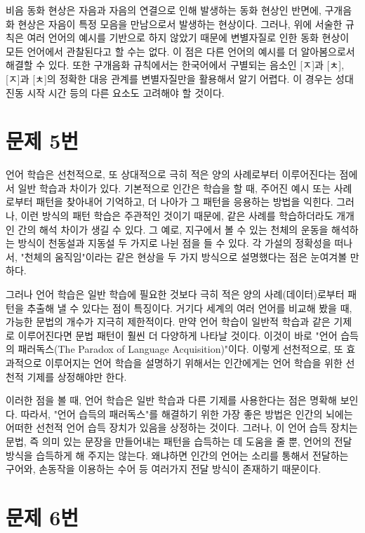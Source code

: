 \documentclass{article}
\begin{document}
            비음 동화 현상은 자음과 자음의 연결으로 인해 발생하는 동화 현상인 반면에, 구개음화 현상은 자음이 특정 모음을 만남으로서 발생하는 현상이다. 그러나, 위에 서술한 규칙은 여러 언어의 예시를 기반으로 하지 않았기 때문에 변별자질로 인한 동화 현상이 모든 언어에서 관찰된다고 할 수는 없다. 이 점은 다른 언어의 예시를 더 알아봄으로서 해결할 수 있다. 또한 구개음화 규칙에서는 한국어에서 구별되는 음소인 [ㅈ]과 [ㅊ], [ㅈ]과 [ㅊ]의 정확한 대응 관계를 변별자질만을 활용해서 알기 어렵다. 이 경우는 성대진동 시작 시간 등의 다른 요소도 고려해야 할 것이다.
    
    \section{문제 5번}
    
        언어 학습은 선천적으로, 또 상대적으로 극히 적은 양의 사례로부터 이루어진다는 점에서 일반 학습과 차이가 있다. 기본적으로 인간은 학습을 할 때, 주어진 예시 또는 사례로부터 패턴을 찾아내어 기억하고, 더 나아가 그 패턴을 응용하는 방법을 익힌다. 그러나, 이런 방식의 패턴 학습은 주관적인 것이기 때문에, 같은 사례를 학습하더라도 개개인 간의 해석 차이가 생길 수 있다. 그 예로, 지구에서 볼 수 있는 천체의 운동을 해석하는 방식이 천동설과 지동설 두 가지로 나뉜 점을 들 수 있다. 각 가설의 정확성을 떠나서, "천체의 움직임"이라는 같은 현상을 두 가지 방식으로 설명했다는 점은 눈여겨볼 만하다.
        
        그러나 언어 학습은 일반 학습에 필요한 것보다 극히 적은 양의 사례(데이터)로부터 패턴을 추출해 낼 수 있다는 점이 특징이다. 거기다 세계의 여러 언어를 비교해 봤을 때, 가능한 문법의 개수가 지극히 제한적이다. 만약 언어 학습이 일반적 학습과 같은 기제로 이루어진다면 문법 패턴이 훨씬 더 다양하게 나타날 것이다. 이것이 바로 "언어 습득의 패러독스(The Paradox of Language Acquisition)"이다. 이렇게 선천적으로, 또 효과적으로 이루어지는 언어 학습을 설명하기 위해서는 인간에게는 언어 학습을 위한 선천적 기제를 상정해야만 한다.
        
        이러한 점을 볼 때, 언어 학습은 일반 학습과 다른 기제를 사용한다는 점은 명확해 보인다. 따라서, "언어 습득의 패러독스"를 해결하기 위한 가장 좋은 방법은 인간의 뇌에는 어떠한 선천적 언어 습득 장치가 있음을 상정하는 것이다. 그러나, 이 언어 습득 장치는 문법, 즉 의미 있는 문장을 만들어내는 패턴을 습득하는 데 도움을 줄 뿐, 언어의 전달 방식을 습득하게 해 주지는 않는다. 왜냐하면 인간의 언어는 소리를 통해서 전달하는 구어와, 손동작을 이용하는 수어 등 여러가지 전달 방식이 존재하기 때문이다.
        
    \section{문제 6번}
        
\end{document}

